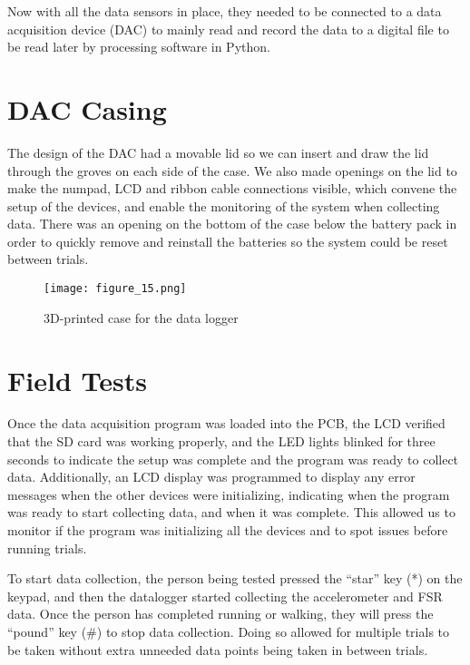 Now with all the data sensors in place, they needed to be connected to a data acquisition device (DAC) to mainly read and record the data to a digital file to be read later by processing software in Python.\par

\section{DAC Casing}

The design of the DAC had a movable lid so we can insert and draw the lid through the groves on each side of the case.
We also made openings on the lid to make the numpad, LCD and ribbon cable connections visible, which convene the setup of the devices, and enable the monitoring of the system when collecting data.
There was an opening on the bottom of the case below the battery pack in order to quickly remove and reinstall the batteries so the system could be reset between trials.

\begin{figure}[h]
  \centering
  \texttt{[image: figure\_15.png]}
  \caption[3D-printed case]{3D-printed case for the data logger}
  \label{fig:x 3d print}
\end{figure}

\section{Field Tests}

Once the data acquisition program was loaded into the PCB, the LCD verified that the SD card was working properly, and the LED lights blinked for three seconds to indicate the setup was complete and the program was ready to collect data.
Additionally, an LCD display was programmed to display any error messages when the other devices were initializing, indicating when the program was ready to start collecting data, and when it was complete.
This allowed us to monitor if the program was initializing all the devices and to spot issues before running trials.\par

To start data collection, the person being tested pressed the “star” key (*) on the keypad, and then the datalogger started collecting the accelerometer and FSR data.
Once the person has completed running or walking, they will press the “pound” key (\#) to stop data collection.
Doing so allowed for multiple trials to be taken without extra unneeded data points being taken in between trials.\par

